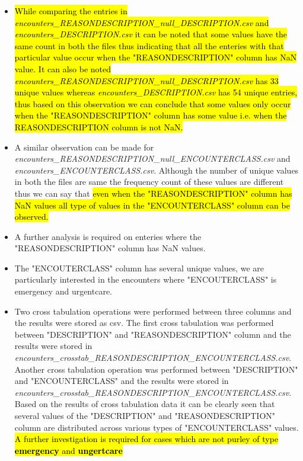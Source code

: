 \documentclass[12pt, twosided]{report}  %
\begin{document}
\begin{itemize}
	\item \hl{While comparing the entries in \textit{encounters\_REASONDESCRIPTION\_null\_DESCRIPTION.csv} and \textit{encounters\_DESCRIPTION.csv} it can be noted that some values have the same count in both the files thus indicating that all the enteries with that particular value occur when the "REASONDESCRIPTION" column has NaN value. It can also be noted \textit{encounters\_REASONDESCRIPTION\_null\_DESCRIPTION.csv} has 33 unique values whereas \textit{encounters\_DESCRIPTION.csv} has 54 unique entries, thus based on this observation we can conclude that some values only occur when the "REASONDESCRIPTION" column has some value i.e. when the REASONDESCRIPTION column is not NaN.}
	
	\item A similar observation can be made for \textit{encounters\_REASONDESCRIPTION\_null\_ENCOUNTERCLASS.csv} and \textit{encounters\_ENCOUNTERCLASS.csv}. Although the number of unique values in both the files are same the frequency count of these values are different thus we can say that \hl{even when the "REASONDESCRIPTION" column has NaN values all type of values in the "ENCOUNTERCLASS" column can be observed.}
	
	\item A further analysis is required on enteries where the "REASONDESCRIPTION" column has NaN values.
	
	\item The "ENCOUTERCLASS" column has several unique values, we are particularly interested in the encounters where "ENCOUTERCLASS" is emergency and urgentcare.
	
	\item Two cross tabulation operations were performed between three columns and the results were stored as csv. The first cross tabulation was performed between "DESCRIPTION" and "REASONDESCRIPTION" column and the results were stored in \newline \textit{encounters\_crosstab\_REASONDESCRIPTION\_ENCOUNTERCLASS.csv}. Another cross tabulation operation was performed between "DESCRIPTION" and "ENCOUNTERCLASS" and the results were stored in \textit{encounters\_crosstab\_REASONDESCRIPTION\_ENCOUNTERCLASS.csv}. Based on the results of cross tabulation data it can be clearly seen that several values of the "DESCRIPTION" and "REASONDESCRIPTION" column are distributed across various types of "ENCOUNTERCLASS" values. \hl{A further investigation is required for cases which are not purley of type \textbf{emergency} and \textbf{ungertcare} }
\end{itemize}
\end{document}
